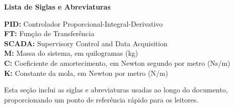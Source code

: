 \begin{titlepage}
    \thispagestyle{empty} %

    \noindent\textbf{\Large Lista de Siglas e Abreviaturas}

    \vspace{1cm} %

    \noindent \textbf{PID:} Controlador Proporcional-Integral-Derivativo \\
    \noindent \textbf{FT:} Função de Transferência \\
    \noindent \textbf{SCADA:} Supervisory Control and Data Acquisition \\
    \noindent \textbf{M:} Massa do sistema, em quilogramas (kg) \\
    \noindent \textbf{C:} Coeficiente de amortecimento, em Newton segundo por metro (Ns/m) \\
    \noindent \textbf{K:} Constante da mola, em Newton por metro (N/m) \\

    \vspace{0.4cm} %

    \noindent Esta seção inclui as siglas e abreviaturas usadas ao longo do documento, proporcionando um ponto de referência rápido para os leitores.

\end{titlepage}
